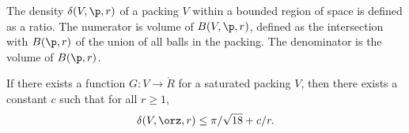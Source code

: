 


The density $\delta( V,\p,r)$ of a packing $ V$ within a bounded
region of space is defined as a ratio. The numerator is volume of
$B(V,\p,r)$, defined as the intersection with $B(\p,r)$ of the union
of all balls in the packing.  The denominator is the volume of
$B(\p,r)$. 
%
%


\begin{lemma} 
\label{lemma:deltabound} %
If there exists a  
function $G: V\to\ring{R}$ for a saturated packing $ V$, then there
exists a constant $c$ such that for all $r\ge1$,
\[  
\delta( V,\orz,r)
\le \pi/\sqrt{18} + c/r.
\] 
\end{lemma}




